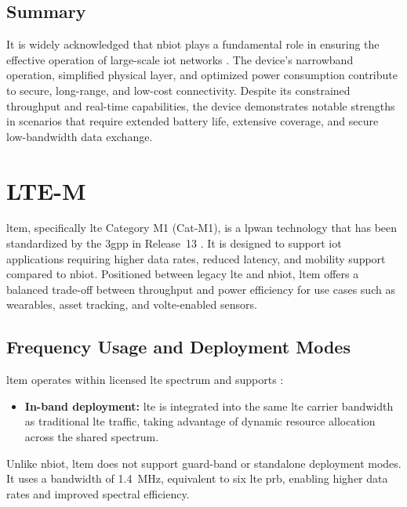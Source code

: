 \documentclass[12pt, english, openany]{book}
\begin{document}
\subsection{Summary}

It is widely acknowledged that \gls{nbiot} plays a fundamental role in ensuring the effective operation of large-scale \gls{iot} networks \parencite{NBIOT_SYSTEM}. The device's narrowband operation, simplified physical layer, and optimized power consumption contribute to secure, long-range, and low-cost connectivity. Despite its constrained throughput and real-time capabilities, the device demonstrates notable strengths in scenarios that require extended battery life, extensive coverage, and secure low-bandwidth data exchange.

\section{LTE-M} \label{sec:ltem}

\gls{ltem}, specifically \gls{lte} Category M1 (Cat-M1), is a \gls{lpwan} technology that has been standardized by the \gls{3gpp} in Release~13 \parencite{LTE_SYSTEM}. It is designed to support \gls{iot} applications requiring higher data rates, reduced latency, and mobility support compared to \gls{nbiot}. Positioned between legacy \gls{lte} and \gls{nbiot}, \gls{ltem} offers a balanced trade-off between throughput and power efficiency for use cases such as wearables, asset tracking, and \gls{volte}-enabled sensors.

\subsection{Frequency Usage and Deployment Modes}

\gls{ltem} operates within licensed \gls{lte} spectrum and supports \parencite{LTE_SYSTEM}:

\begin{itemize}
    \item \textbf{In-band deployment:} \gls{lte} is integrated into the same \gls{lte} carrier bandwidth as traditional \gls{lte} traffic, taking advantage of dynamic resource allocation across the shared spectrum.
\end{itemize}

Unlike \gls{nbiot}, \gls{ltem} does not support guard-band or standalone deployment modes. It uses a bandwidth of \SI{1.4}{MHz}, equivalent to six \gls{lte} \gls{prb}, enabling higher data rates and improved spectral efficiency.
\end{document}
